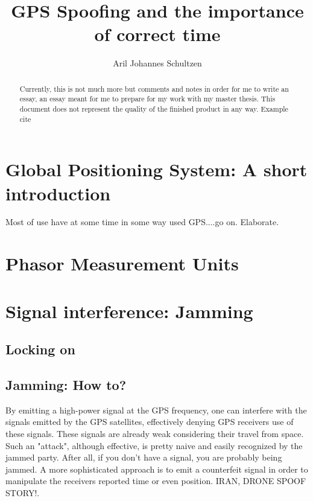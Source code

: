 \documentclass[12pt,english,a4paper]{article}
\title{GPS Spoofing and the importance of correct time}
\author{Aril Johannes Schultzen}
\begin{document}
\maketitle
\thispagestyle{empty}
\setcounter{page}{0}
\newpage
\tableofcontents
\thispagestyle{empty}
\setcounter{page}{0}
\newpage
\thispagestyle{empty}
\setcounter{page}{0}

\begin{abstract}
Currently, this is not much more but comments and notes in order for me to write an essay, an essay meant for me to prepare for my work with my master thesis. This document does not represent the quality of the finished product in any way. Example cite \cite{KandR}
\end{abstract}

\newpage
\clearpage
\setcounter{page}{1}

\section{Global Positioning System: A short introduction}
Most of use have at some time in some way used GPS....go on. Elaborate.

\section{Phasor Measurement Units}

\section{Signal interference: Jamming}
\subsection{Locking on}
\subsection{Jamming: How to?}

By emitting a high-power signal at the GPS frequency, one can interfere with the signals emitted by the GPS satellites, effectively denying GPS receivers use of these signals. These signals are already weak considering their travel from space. Such an "attack", although effective, is pretty naive and easily recognized by the jammed party. After all, if you don't have a signal, you are probably being jammed. A more sophisticated approach is to emit a counterfeit signal in order to manipulate the receivers reported time or even position. IRAN, DRONE SPOOF STORY!. 
\end{document}
